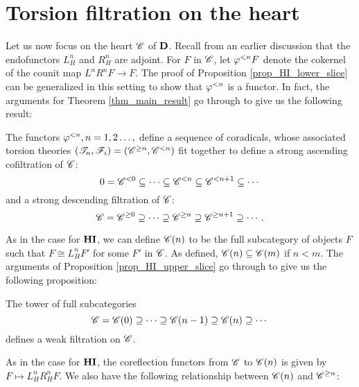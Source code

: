 \section{Torsion filtration on the heart}

Let us now focus on the heart $\Cat{C}$ of $\DCat$. Recall from
an earlier discussion that the endofunctors $L_H^n$ and $R_H^n$ 
are adjoint. For $F$ in $\Cat{C}$, let $\corad{n} F$ denote the 
cokernel of the counit map $L^n R^n F \to F$. The proof of 
Proposition \ref{prop_HI_lower_slice} can be generalized in this 
setting to show that $\corad{n}$ is a functor. In fact, the 
arguments for Theorem \ref{thm_main_result} go through to give us
the following result:

\begin{thm}\label{thm_sum_heart}
The functors $\corad{n}, n = 1, 2\dots,$ define a sequence of
coradicals, whose associated torsion theories $(\Cat{T}_n,
\Cat{F}_i) = (\Prerad{n}{\Cat{C}}, \Corad{n}{\Cat{C}})$ fit together
to define a strong ascending cofiltration of $\Cat{C}$:
\[
0 = \Corad{0}{\Cat{C}} \subseteq \cdots \subseteq \Corad{n}{\Cat{C}}
   \subseteq \Corad{n + 1}{\Cat{C}} \subseteq \cdots
\]
and a strong descending filtration of $\Cat{C}$:
\[
\Cat{C} = \Prerad{0}{\Cat{C}} \supseteq \cdots \supseteq \Prerad{n}{\Cat{C}}
\supseteq \Prerad{n + 1}{\Cat{C}} \supseteq \cdots.
\]
\end{thm}

As in the case for $\HI$, we can define $\SGFilt{n}{\Cat{C}}$ to be
the full subcategory of objects $F$ such that $F \cong L_H^nF'$
for some $F'$ in $\Cat{C}$. As defined, $\SGFilt{n}{\Cat{C}}
\subseteq \SGFilt{m}{\Cat{C}}$ if $n < m$. The arguments of 
Proposition \ref{prop_HI_upper_slice} go through to give us the 
following proposition:

\begin{prop}
The tower of full subcategories
\[
\Cat{C} = \SGFilt{0}{\Cat{C}} \supseteq \cdots \supseteq \SGFilt{n - 1}{\Cat{C}}
\supseteq \SGFilt{n}{\Cat{C}} \supseteq \cdots
\]
defines a weak filtration on $\Cat{C}$.
\end{prop}

As in the case for $\HI$, the coreflection functors from $\Cat{C}$ 
to $\SGFilt{n}{\Cat{C}}$ is given by $F \mapsto L_H^n R_H^n F$. We 
also have the following relationship between $\SGFilt{n}{\Cat{C}}$ 
and $\Prerad{n}{\Cat{C}}$:

